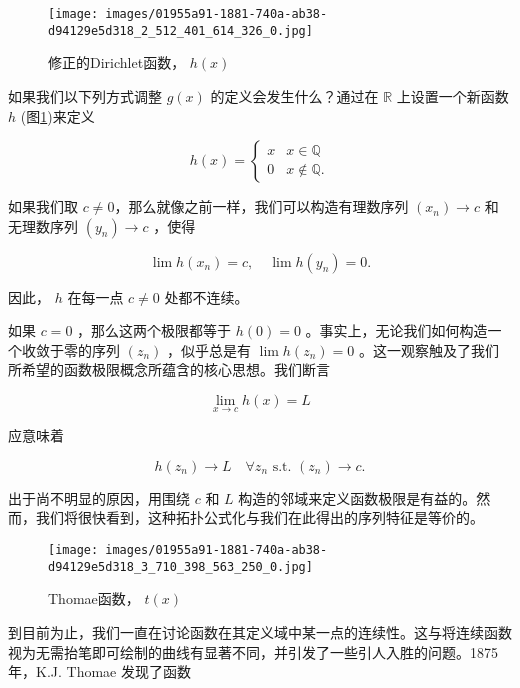 \begin{figure}[h]
  \centering
  \texttt{[image: images/01955a91-1881-740a-ab38-d94129e5d318\_2\_512\_401\_614\_326\_0.jpg]}
  \caption{修正的Dirichlet函数， \(h\left( x\right)\) }
  \label{fig:4.2}
\end{figure}

如果我们以下列方式调整 \(g\left( x\right)\) 的定义会发生什么？通过在 \(\mathbb{R}\) 上设置一个新函数 \(h\) (图\ref{fig:4.2})来定义

\[
h\left( x\right)  = \left\{  \begin{array}{ll} x & x \in  \mathbb{Q} \\  0 & x \notin  \mathbb{Q}. \end{array}\right.
\]

如果我们取 \(c\ne 0\)，那么就像之前一样，我们可以构造有理数序列 \(\left( {x}_{n}\right)  \rightarrow  c\) 和无理数序列 \(\left( {y}_{n}\right)  \rightarrow  c\) ，使得

\[
\lim h\left( {x}_{n}\right)  = c, \quad \lim h\left( {y}_{n}\right)  = 0.
\]

因此， \(h\) 在每一点 \(c \neq  0\) 处都不连续。

如果 \(c = 0\) ，那么这两个极限都等于 \(h\left( 0\right)  = 0\) 。事实上，无论我们如何构造一个收敛于零的序列 \(\left( {z}_{n}\right)\) ，似乎总是有 \(\lim h\left( {z}_{n}\right)  = 0\) 。这一观察触及了我们所希望的函数极限概念所蕴含的核心思想。我们断言

\[
\mathop{\lim }\limits_{{x \rightarrow  c}}h\left( x\right)  = L
\]

应意味着

\[
h\left( {z}_{n}\right)  \rightarrow  L \quad \forall z_n \text{ s.t. } \left( {z}_{n}\right)  \rightarrow  c.
\]

出于尚不明显的原因，用围绕 \(c\) 和 \(L\) 构造的邻域来定义函数极限是有益的。然而，我们将很快看到，这种拓扑公式化与我们在此得出的序列特征是等价的。



\begin{figure}[h]
  \centering
  \texttt{[image: images/01955a91-1881-740a-ab38-d94129e5d318\_3\_710\_398\_563\_250\_0.jpg]}
  \caption{Thomae函数， \(t\left( x\right)\) }
  \label{fig:4.3}
\end{figure}


到目前为止，我们一直在讨论函数在其定义域中某一点的连续性。这与将连续函数视为无需抬笔即可绘制的曲线有显著不同，并引发了一些引人入胜的问题。1875年，K.J. Thomae 发现了函数

